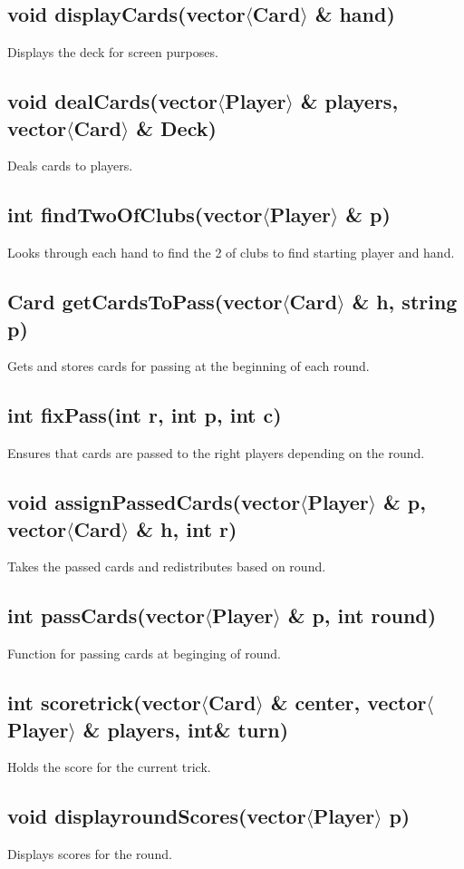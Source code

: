 \documentclass[]{scrartcl}
\begin{document}
\subsection{void displayCards(vector$\langle$Card$\rangle$ \& hand)}
	Displays the deck for screen purposes.
\subsection{void dealCards(vector$\langle$Player$\rangle$ \& players, vector$\langle$Card$\rangle$ \& Deck)}
	Deals cards to players.
\subsection{int findTwoOfClubs(vector$\langle$Player$\rangle$ \& p)}  
	Looks through each hand to find the 2 of clubs to find starting player and hand.
\subsection{Card getCardsToPass(vector$\langle$Card$\rangle$ \& h, string p) }
	Gets and stores cards for passing at the beginning of each round.
\subsection{int fixPass(int r, int p, int c)}
	Ensures that cards are passed to the right players depending on the round.
\subsection{void assignPassedCards(vector$\langle$Player$\rangle$ \& p, vector$\langle$Card$\rangle$ \& h, int r)  }
	Takes the passed cards and redistributes based on round.
\subsection{int passCards(vector$\langle$Player$\rangle$ \& p, int round)  }
	Function for passing cards at beginging of round.
\subsection{int scoretrick(vector$\langle$Card$\rangle$ \& center, vector$\langle$Player$\rangle$ \& players, int\& turn)}
	Holds the score for the current trick.
\subsection{void displayroundScores(vector$\langle$Player$\rangle$ p)}
	Displays scores for the round.
\end{document}
